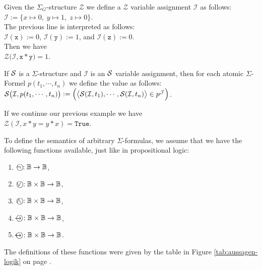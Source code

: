 \exampleEng
Given the $\Sigma_G$-structure
$\mathcal{Z}$ we define a $\mathcal{Z}$ variable assignment $\mathcal{I}$ as follows:
\\[0.2cm]
\hspace*{1.3cm} $\mathcal{I} := \bigl\{ x \mapsto 0,\; y \mapsto 1,\; z \mapsto 0\bigr\}$.
\\[0.2cm]
The previous line is interpreted as follows:
\\[0.2cm]
\hspace*{1.3cm} $\mathcal{I}(\mathtt{x}) := 0$, \quad $\mathcal{I}(\mathtt{y}) := 1$, \quad and \quad $\mathcal{I}(\mathtt{z}) := 0$.
\\[0.2cm]
Then we have  \\[0.2cm]
\hspace*{1.3cm}  $\mathcal{Z}\bigl(\mathcal{I}, \mathtt{x} * \mathtt{y} \bigr) = 1$. \eox

\begin{Definition}
    If $\mathcal{S}$ is a  $\Sigma$-structure and $\mathcal{I}$ is an $\mathcal{S}$ variable assignment,
    then for each atomic $\Sigma$-Formel 
    $p(t_1, \cdots, t_n)$ we define the value  as follows: \\[0.2cm]
    \hspace*{1.3cm}
    $\mathcal{S}\bigl(\mathcal{I}, p(t_1,\cdots,t_n)\bigr) := 
       \Bigl(\bigl\langle \mathcal{S}(\mathcal{I}, t_1), \cdots, \mathcal{S}(\mathcal{I}, t_n) \bigr\rangle \in p^\mathcal{J}\Bigr)$.
    \eox
\end{Definition}

\exampleEng
If we continue our previous example we have
\\[0.2cm]
\hspace*{1.3cm} 
$\mathcal{Z}(\mathcal{I},x * y = y * x) = \mathtt{True}$.
\eox

To define the semantics of arbitrary $\Sigma$-formulas, we assume that we have the following functions
available, just like in propositional logic: 
\begin{enumerate}
\item $\circneg: \mathbb{B} \rightarrow \mathbb{B}$,
\item $\circvee: \mathbb{B} \times \mathbb{B} \rightarrow \mathbb{B}$,
\item $\circwedge: \mathbb{B} \times \mathbb{B} \rightarrow \mathbb{B}$,
\item $\circright: \mathbb{B} \times \mathbb{B} \rightarrow \mathbb{B}$,
\item $\circleftright: \mathbb{B} \times \mathbb{B} \rightarrow \mathbb{B}$.
\end{enumerate}
The definitions of these functions were given by the table in Figure \ref{tab:aussagen-logik} on page
\pageref{tab:aussagen-logik}.

